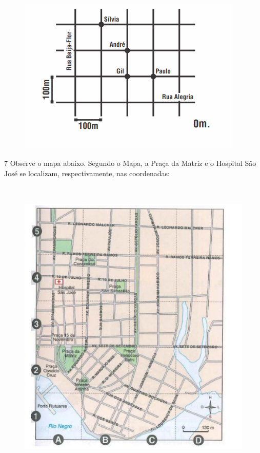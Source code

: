 \begin{figure}
\includegraphics[width=4.19792in,height=2.93056in]{./imgSAEB_6_MAT/media/image69.png}
\end{figure}


\num{7}  Observe o mapa abaixo. Segundo o Mapa, a Praça da Matriz e o Hospital São José se localizam,
respectivamente, nas coordenadas:

\begin{figure}
\includegraphics[width=5.08333in,height=5.71875in]{./imgSAEB_6_MAT/media/image70.png}
\end{figure}

